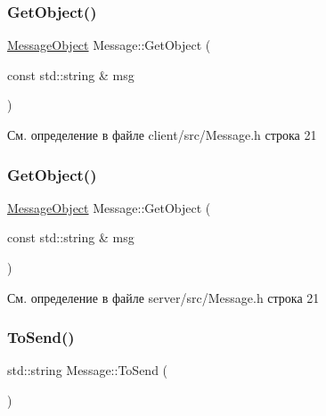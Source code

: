 \subsubsection{\texorpdfstring{GetObject()}{GetObject()}\hspace{0.1cm}{\footnotesize\ttfamily [1/2]}}
{\footnotesize\ttfamily \mbox{\hyperlink{class_message_object}{Message\+Object}} Message\+::\+Get\+Object (\begin{DoxyParamCaption}\item[{const std\+::string \&}]{msg }\end{DoxyParamCaption})\hspace{0.3cm}{\ttfamily [inline]}}



См. определение в файле client/src/\+Message.\+h строка 21

\mbox{\label{class_message_a5e0807f65e54b9db9a9144d96c23c859}} 
\subsubsection{\texorpdfstring{GetObject()}{GetObject()}\hspace{0.1cm}{\footnotesize\ttfamily [2/2]}}
{\footnotesize\ttfamily \mbox{\hyperlink{class_message_object}{Message\+Object}} Message\+::\+Get\+Object (\begin{DoxyParamCaption}\item[{const std\+::string \&}]{msg }\end{DoxyParamCaption})\hspace{0.3cm}{\ttfamily [inline]}}



См. определение в файле server/src/\+Message.\+h строка 21

\mbox{\label{class_message_a04d7d7a2d696dc3183a76fcde39ebd73}} 
\subsubsection{\texorpdfstring{ToSend()}{ToSend()}\hspace{0.1cm}{\footnotesize\ttfamily [1/2]}}
{\footnotesize\ttfamily std\+::string Message\+::\+To\+Send (\begin{DoxyParamCaption}{ }\end{DoxyParamCaption})\hspace{0.3cm}{\ttfamily [inline]}}



